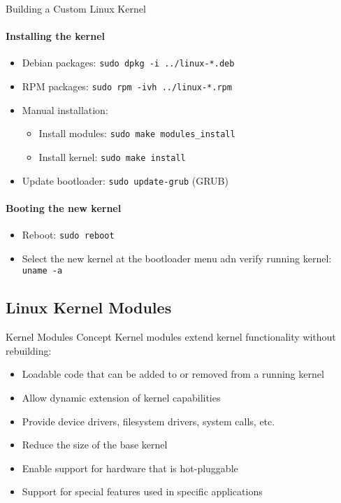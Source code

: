 \begin{KR}{Building a Custom Linux Kernel}
\begin{minipage}{0.5\linewidth}
    \paragraph{Installing the kernel}
    \begin{itemize}
        \item Debian packages: \texttt{sudo dpkg -i ../linux-*.deb}
        \item RPM packages: \texttt{sudo rpm -ivh ../linux-*.rpm}
        \item Manual installation:
            \begin{itemize}
                \item Install modules: \texttt{sudo make modules\_install}
                \item Install kernel: \texttt{sudo make install}
            \end{itemize}
        \item Update bootloader: \texttt{sudo update-grub} (GRUB)
    \end{itemize}
    \end{minipage}
    
    \paragraph{Booting the new kernel}
    \begin{itemize}
        \item Reboot: \texttt{sudo reboot}
        \item Select the new kernel at the bootloader menu adn verify running kernel: \texttt{uname -a}
    \end{itemize}
\end{KR}

\subsection{Linux Kernel Modules}

\begin{definition}{Kernel Modules Concept}
    Kernel modules extend kernel functionality without rebuilding:
    \begin{itemize}
        \item Loadable code that can be added to or removed from a running kernel
        \item Allow dynamic extension of kernel capabilities
        \item Provide device drivers, filesystem drivers, system calls, etc.
        \item Reduce the size of the base kernel
        \item Enable support for hardware that is hot-pluggable
        \item Support for special features used in specific applications
    \end{itemize}
\end{definition}

